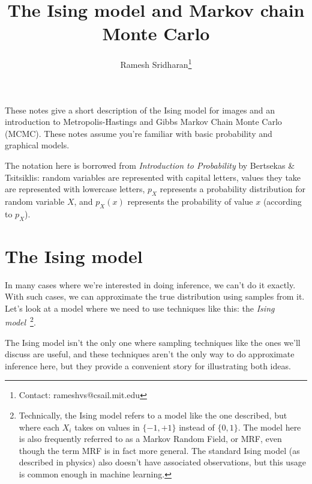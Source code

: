 \documentclass[12pt]{article}
\title{The Ising model and Markov chain Monte Carlo}
\author{Ramesh Sridharan\thanks{Contact: \mbox{rameshvs@csail.mit.edu}}}
\date{}
\begin{document}
    \maketitle
    These notes give a short description of the Ising model for images and an
    introduction to Metropolis-Hastings and Gibbs Markov Chain Monte Carlo (MCMC).
    These notes assume you're familiar with basic probability and graphical models.
    
    The notation here is borrowed from \emph{Introduction to Probability} by
    Bertsekas \& Tsitsiklis: random variables are represented with capital
    letters, values they take are represented with lowercase letters, $p_X$
    represents a probability distribution for random variable $X$, and $p_X(x)$
    represents the probability of value $x$ (according to $p_X$).
    \section{The Ising model}

    In many cases where we're interested in doing inference, we can't do
    it exactly. With such cases, we can approximate the true distribution using
    samples from it.  Let's look at a model where we need to use techniques
    like this: the \emph{Ising model}~\footnote{Technically, the Ising model
        refers to a model like the one described, but where each $X_i$ takes on
        values in $\{-1, +1\}$ instead of $\{0,1\}$. The model here is also
        frequently referred to as a Markov Random Field, or MRF, even though
        the term MRF is in fact more general. The standard Ising model (as
        described in physics) also doesn't have associated observations,
        but this usage is common enough in machine learning.}.

    The Ising model isn't the only one where sampling techniques like the ones
    we'll discuss are useful, and these techniques aren't the only way to do
    approximate inference here, but they provide a convenient story for
    illustrating both ideas.
\end{document}
